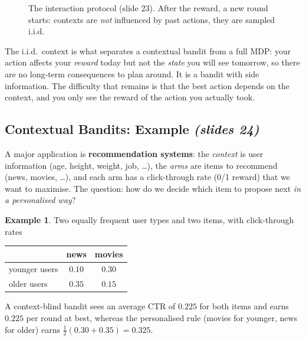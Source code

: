 \documentclass[11pt,a4paper]{article}
\newcommand{\slides}[1]{\emph{(slides #1)}}
\theoremstyle{plain}
\theoremstyle{definition}
\newtheorem{example}[theorem]{Example}
\theoremstyle{remark}
\begin{document}
\begin{figure}[ht]
\centering
{}
\caption{The interaction protocol (slide 23). After the reward, a new round starts: contexts are \emph{not} influenced by past actions, they are sampled i.i.d.}
\end{figure}

\begin{intuition}
The i.i.d.\ context is what separates a contextual bandit from a full MDP: your action affects your \emph{reward} today but not the \emph{state}
you will see tomorrow, so there are no long-term consequences to plan around. It is a bandit with side information. The difficulty that remains is that
the best action depends on the context, and you only see the reward of the action you actually took.
\end{intuition}

\subsection{Contextual Bandits: Example \slides{24}}

A major application is \textbf{recommendation systems}: the \emph{context} is user information (age, height, weight, job, \dots), the \emph{arms} are items to recommend
(news, movies, \dots), and each arm has a click-through rate (0/1 reward) that we want to maximise. The question: how do we decide which item to propose next \emph{in a personalised way}?

\begin{example}\label{ex:reco}
Two equally frequent user types and two items, with click-through rates

\smallskip
\begin{center}
\begin{tabular}{lcc}\toprule
 & news & movies\\\midrule
 younger users & $0.10$ & $0.30$\\ older users & $0.35$ & $0.15$\\\bottomrule
\end{tabular}
\end{center}
A context-blind bandit sees an average CTR of $0.225$ for both items and earns $0.225$ per round at best, whereas the personalised rule
(movies for younger, news for older) earns $\tfrac12(0.30+0.35)=0.325$.
\end{example}
\end{document}
